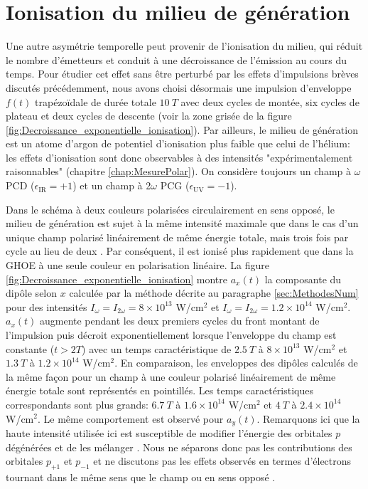 \section{Ionisation du milieu de génération}
\label{sec:Ionisation}
Une autre asymétrie temporelle peut provenir de l'ionisation du milieu, qui réduit le nombre d'émetteurs et conduit à une décroissance de l'émission au cours du temps. Pour étudier cet effet sans être perturbé par les effets d'impulsions brèves discutés précédemment, nous avons choisi désormais une impulsion d'enveloppe $f(t)$ trapézoïdale de durée totale $10 \: T$ avec deux cycles de montée, six cycles de plateau et deux cycles de descente (voir la zone grisée de la figure \ref{fig:Decroissance_exponentielle_ionisation}). Par ailleurs, le milieu de génération est un atome d'argon de potentiel d'ionisation plus faible que celui de l'hélium: les effets d'ionisation sont donc observables à des intensités "expérimentalement raisonnables" (chapitre \ref{chap:MesurePolar}). On considère toujours un champ à $\omega$ PCD ($\epsilon_{\text{IR}} = +1$) et un champ à 2$\omega$ PCG ($\epsilon_{\text{UV}} = -1$).

Dans le schéma à deux couleurs polarisées circulairement en sens opposé, le milieu de génération est sujet à la même intensité maximale que dans le cas d'un unique champ polarisé linéairement de  même énergie totale, mais trois fois par cycle au lieu de deux . Par conséquent, il est ionisé plus rapidement que dans la GHOE à une seule couleur en polarisation linéaire. La figure \ref{fig:Decroissance_exponentielle_ionisation} montre $a_x(t)$ la composante du dipôle selon $x$ calculée par la méthode décrite au paragraphe \ref{sec:MethodesNum} pour des intensités $I_\omega = I_{2\omega} = 8 \times 10^{13}$ W/cm$^2$ et $I_\omega = I_{2\omega} = 1.2 \times 10^{14}$ W/cm$^2$. $a_x(t)$ augmente pendant les deux premiers cycles du front montant de l'impulsion puis décroit exponentiellement lorsque l'enveloppe du champ est constante ($t > 2T$) avec un temps caractéristique de $2.5 \: T$ à $8 \times 10^{13}$ W/cm$^2$ et $1.3 \: T$ à $1.2 \times 10^{14}$ W/cm$^2$. En comparaison, les enveloppes des dipôles calculés de la même façon pour un champ à une couleur polarisé linéairement de même énergie totale sont représentés en pointillés. Les temps caractéristiques correspondants sont plus grands: $6.7 \: T$ à $1.6 \times 10^{14}$ W/cm$^2$ et $4 \: T$ à $2.4 \times 10^{14}$ W/cm$^2$. Le même comportement est observé pour $a_y (t)$. Remarquons ici que la haute intensité utilisée ici est susceptible de modifier l'énergie des orbitales $p$ dégénérées et de les mélanger . Nous ne séparons donc pas les contributions des orbitales $p_{+1}$ et $p_{-1}$ et ne discutons pas les effets observés en termes d'électrons tournant dans le même sens que le champ ou en sens opposé .

